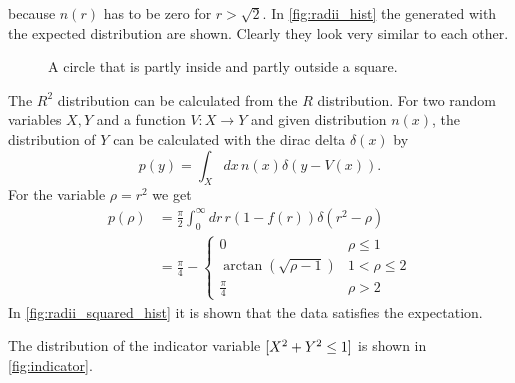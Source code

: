 because $n(r)$ has to be zero for $r > \sqrt 2$. 
In \cref{fig:radii_hist} the generated with the expected distribution are shown. 
Clearly they look very similar to each other.\par
%
\begin{figure}[h]
    \centering
    \caption{A circle that is partly inside and partly outside a square.}
    \label{fig:circle_square}
\end{figure}
%
The $R^2$ distribution can be calculated from the $R$ distribution. For two random variables $X, Y$ and 
a function $V: X \rightarrow Y$ and given distribution $n(x)$, the distribution of 
$Y$ can be calculated with the dirac delta $\delta(x)$ by 
\[
    p(y) = \int_X dx\, n(x) \delta(y - V(x)).
\] 
For the variable $\rho = r^2$ we get 
\begin{align*}
    p(\rho) &= \frac \pi 2 \int_0^{\infty} dr\, r(1-f(r)) \delta(r^2 - \rho) \\
    &= \frac \pi 4 - 
    \begin{cases}
        0 & \rho \leq 1 \\
        \arctan(\sqrt{\rho - 1}) & 1 < \rho \leq 2 \\
        \frac{\pi}{4} & \rho > 2
    \end{cases}
\end{align*}
In \cref{fig:radii_squared_hist} it is shown that the data satisfies the expectation.\par 
The distribution of the indicator variable $[X^2 + Y^2 \leq 1]$ is shown in \cref{fig:indicator}.
%
